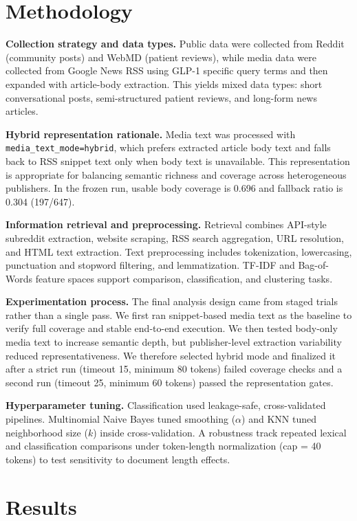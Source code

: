\documentclass[10pt,letterpaper,twocolumn]{article}
\begin{document}
\section{Methodology}
\textbf{Collection strategy and data types.} Public data were collected from Reddit (community posts) and WebMD (patient reviews), while media data were collected from Google News RSS using GLP-1 specific query terms and then expanded with article-body extraction. This yields mixed data types: short conversational posts, semi-structured patient reviews, and long-form news articles.

\textbf{Hybrid representation rationale.} Media text was processed with \texttt{media\_text\_mode=hybrid}, which prefers extracted article body text and falls back to RSS snippet text only when body text is unavailable. This representation is appropriate for balancing semantic richness and coverage across heterogeneous publishers. In the frozen run, usable body coverage is 0.696 and fallback ratio is 0.304 (197/647).

\textbf{Information retrieval and preprocessing.} Retrieval combines API-style subreddit extraction, website scraping, RSS search aggregation, URL resolution, and HTML text extraction. Text preprocessing includes tokenization, lowercasing, punctuation and stopword filtering, and lemmatization. TF-IDF and Bag-of-Words feature spaces support comparison, classification, and clustering tasks.

\textbf{Experimentation process.} The final analysis design came from staged trials rather than a single pass. We first ran snippet-based media text as the baseline to verify full coverage and stable end-to-end execution. We then tested body-only media text to increase semantic depth, but publisher-level extraction variability reduced representativeness. We therefore selected hybrid mode and finalized it after a strict run (timeout 15, minimum 80 tokens) failed coverage checks and a second run (timeout 25, minimum 60 tokens) passed the representation gates.

\textbf{Hyperparameter tuning.} Classification used leakage-safe, cross-validated pipelines. Multinomial Naive Bayes tuned smoothing ($\alpha$) and KNN tuned neighborhood size ($k$) inside cross-validation. A robustness track repeated lexical and classification comparisons under token-length normalization (cap = 40 tokens) to test sensitivity to document length effects.

\section{Results}
\end{document}
